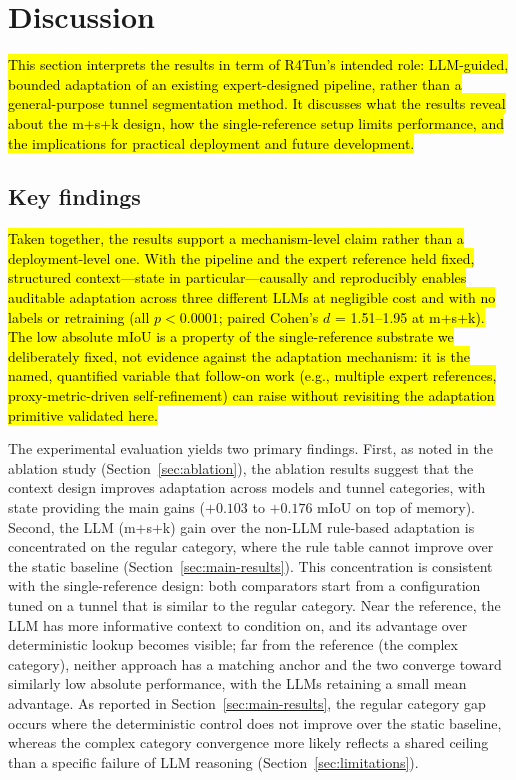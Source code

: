 \documentclass[a4paper,fleqn]{cas-dc}
\begin{document}
{%
\section{Discussion}\label{sec:discussion}

\hl{This section interprets the results in term of R4Tun's intended role: LLM-guided, bounded adaptation of an existing expert-designed pipeline, rather than a general-purpose tunnel segmentation method. It discusses what the results reveal about the m+s+k design, how the single-reference setup limits performance, and the implications for practical deployment and future development.}

\subsection{Key findings}

\hl{Taken together, the results support a mechanism-level claim rather than a deployment-level one. With the pipeline and the expert reference held fixed, structured context---state in particular---causally and reproducibly enables auditable adaptation across three different LLMs at negligible cost and with no labels or retraining (all \mbox{$p < 0.0001$}; paired Cohen's \mbox{$d$} = 1.51--1.95 at m+s+k). The low absolute mIoU is a property of the single-reference substrate we deliberately fixed, not evidence against the adaptation mechanism: it is the named, quantified variable that follow-on work (e.g., multiple expert references, proxy-metric-driven self-refinement) can raise without revisiting the adaptation primitive validated here.}

The experimental evaluation yields two primary findings. First, as noted in the ablation study (Section~\ref{sec:ablation}), the ablation results suggest that the context design improves adaptation across models and tunnel categories, with state providing the main gains ($+0.103$ to $+0.176$ mIoU on top of memory). Second, the LLM (m+s+k) gain over the non-LLM rule-based adaptation is concentrated on the regular category, where the rule table cannot improve over the static baseline (Section~\ref{sec:main-results}). This concentration is consistent with the single-reference design: both comparators start from a configuration tuned on a tunnel that is similar to the regular category. Near the reference, the LLM has more informative context to condition on, and its advantage over deterministic lookup becomes visible; far from the reference (the complex category), neither approach has a matching anchor and the two converge toward similarly low absolute performance, with the LLMs retaining a small mean advantage. As reported in Section~\ref{sec:main-results}, the regular category gap occurs where the deterministic control does not improve over the static baseline, whereas the complex category convergence more likely reflects a shared ceiling than a specific failure of LLM reasoning (Section~\ref{sec:limitations}).


}
\end{document}
